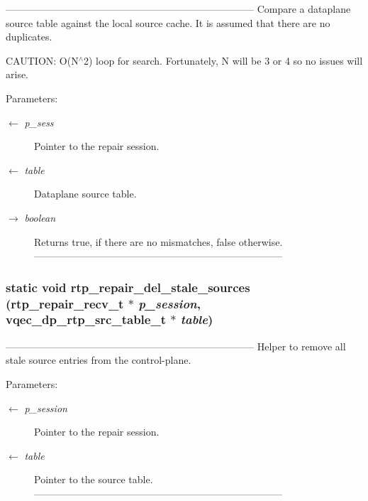 --------------------------------------------------------------------------- Compare a dataplane source table against the local source cache. It is assumed that there are no duplicates.

CAUTION: O(N$^\wedge$2) loop for search. Fortunately, N will be 3 or 4 so no issues will arise.

\begin{Desc}
\item[Parameters:]
\begin{description}
\item[\mbox{$\leftarrow$} {\em p\_\-sess}]Pointer to the repair session. \item[\mbox{$\leftarrow$} {\em table}]Dataplane source table. \item[\mbox{$\rightarrow$} {\em boolean}]Returns true, if there are no mismatches, false otherwise. --------------------------------------------------------------------------- \end{description}
\end{Desc}
\subsubsection{\setlength{\rightskip}{0pt plus 5cm}static void rtp\_\-repair\_\-del\_\-stale\_\-sources (\bf{rtp\_\-repair\_\-recv\_\-t} $\ast$ {\em p\_\-session}, vqec\_\-dp\_\-rtp\_\-src\_\-table\_\-t $\ast$ {\em table})\hspace{0.3cm}{\tt  [static]}}\label{rtp__repair__recv_8c_e76a08b68c0fe25f21ddc9d1e2d7e67e}


--------------------------------------------------------------------------- Helper to remove all stale source entries from the control-plane.

\begin{Desc}
\item[Parameters:]
\begin{description}
\item[\mbox{$\leftarrow$} {\em p\_\-session}]Pointer to the repair session. \item[\mbox{$\leftarrow$} {\em table}]Pointer to the source table. --------------------------------------------------------------------------- \end{description}
\end{Desc}
